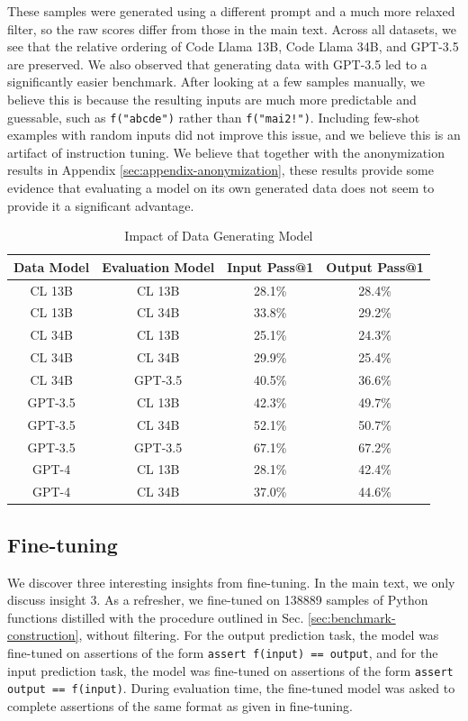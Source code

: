 These samples were generated using a different prompt and a much more relaxed filter, so the raw scores differ from those in the main text. Across all datasets, we see that the relative ordering of Code Llama 13B, Code Llama 34B, and GPT-3.5 are preserved. We also observed that generating data with GPT-3.5 led to a significantly easier benchmark. After looking at a few samples manually, we believe this is because the resulting inputs are much more predictable and guessable, such as \texttt{f("abcde")} rather than \texttt{f("mai2!")}. Including few-shot examples with random inputs did not improve this issue, and we believe this is an artifact of instruction tuning. We believe that together with the anonymization results in Appendix \ref{sec:appendix-anonymization}, these results provide some evidence that evaluating a model on its own generated data does not seem to provide it a significant advantage.


\begin{table}[H]
    \centering
    \caption{Impact of Data Generating Model}
    \begin{tabular}{cccc}
        \toprule
        \textbf{Data Model} & \textbf{Evaluation Model} & \textbf{Input Pass@1} & \textbf{Output Pass@1} \\
        \midrule
        CL 13B & CL 13B & 28.1\% & 28.4\% \\
        CL 13B & CL 34B & 33.8\% & 29.2\% \\
        \midrule
        CL 34B & CL 13B & 25.1\% & 24.3\% \\
        CL 34B & CL 34B & 29.9\% & 25.4\% \\
        CL 34B & GPT-3.5 & 40.5\% & 36.6\% \\
        \midrule
        GPT-3.5 & CL 13B & 42.3\% & 49.7\% \\
        GPT-3.5 & CL 34B & 52.1\% & 50.7\% \\
        GPT-3.5 & GPT-3.5 & 67.1\% & 67.2\% \\
        \midrule
        GPT-4 & CL 13B & 28.1\% & 42.4\% \\
        GPT-4 & CL 34B & 37.0\% & 44.6\% \\
        \bottomrule
    \end{tabular}
    \label{tab:benchmark-results-data-generating}
\end{table}

\subsection{Fine-tuning} \label{subsec:appendix-finetuning}
We discover three interesting insights from fine-tuning. In the main text, we only discuss insight 3. As a refresher, we fine-tuned \codellamalarge on 138889 samples of Python functions distilled with the procedure outlined in Sec. \ref{sec:benchmark-construction}, without filtering. For the output prediction task, the model was fine-tuned on assertions of the form \texttt{assert f(input) == output}, and for the input prediction task, the model was fine-tuned on assertions of the form \texttt{assert output == f(input)}. During evaluation time, the fine-tuned model was asked to complete assertions of the same format as given in fine-tuning. 

